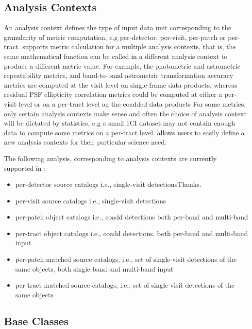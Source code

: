 \subsection{Analysis Contexts} \label{ssec:analysis_context}

An analysis context defines the type of input data unit corresponding to the granularity of metric computation, e.g per-detector, per-visit, per-patch or per-tract.
\faro supports metric calculation for a multiple analysis contexts, that is, the same mathematical function can be called in a different analysis context to produce a different metric value. 
For example, the photometric and astrometric repeatability metrics,  and  band-to-band astrometric transformation accuracy metrics are computed  at the visit level on single-frame data products, whereas  residual PSF ellipticity correlation metrics could be computed at either a per-visit level or on a per-tract level on the coadded data products
For some metrics, only certain analysis contexts make sense and often the choice of analysis context will be dictated by statistics, e.g a small 1\degsq CI dataset may not contain enough data to compute some metrics on a per-tract level. 
\faro allows users to easily define a new analysis contexts for their particular science need. 

The following analysis, corresponding to analysis contexts  are currently supported in \faro:
\begin{itemize}
\item per-detector source catalogs i.e., single-visit detectionsThanks.
\item per-visit source catalogs i.e., single-visit detections
\item per-patch object catalogs i.e., coadd detections both per-band and multi-band
\item per-tract object catalogs i.e., coadd detections, both per-band and multi-band input
\item per-patch matched source catalogs, i.e., set of single-visit detections of the same objects, both single band and multi-band input
\item per-tract matched source catalogs, i.e., set of single-visit detections of the same objects 
\end{itemize}

\subsection{Base Classes} \label{ssec:base_classes}



